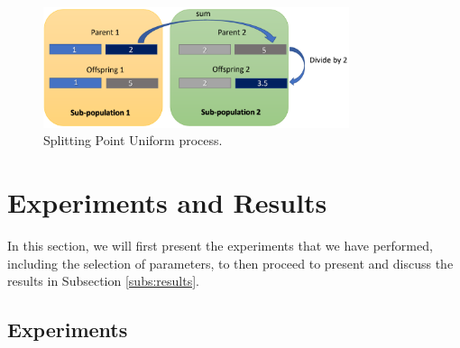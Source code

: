 \documentclass[runningheads]{llncs}
\begin{document}
\begin{figure}[!htp]
  \centering
  \includegraphics[width=0.8\textwidth]{img/splittinPointUniform.png}
  \caption{Splitting Point Uniform process.} \label{fig4}
  \end{figure}


  



  \section{Experiments and Results}
  \label{sec:exp}

  In this section, we will first present the experiments that we have performed,
  including the selection of parameters, to then proceed to present and discuss
  the results in Subsection \ref{subs:results}. 
    
  \subsection{Experiments}
\end{document}
